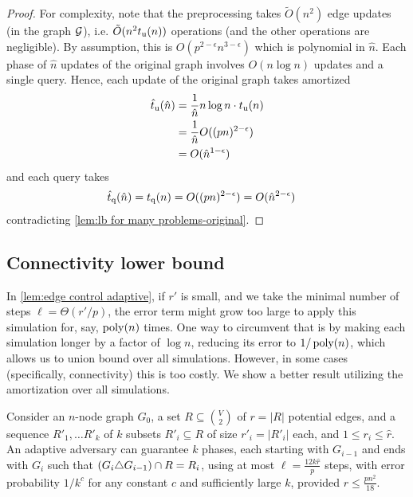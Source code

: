 \documentclass[letter,11pt]{article}
\newcommand{\tu}{t_{\textnormal{u}}}
\newcommand{\tq}{t_{\textnormal{q}}}
\begin{document}
\begin{proof}
    For complexity, 
    note that the preprocessing takes $\tilde O(n^2)$ edge updates (in the graph $\cal G$),
    i.e. $\tilde O(n^2\tu(n))$ operations
    (and the other operations are negligible).
    By assumption, this is 
    $O(p^{2-\epsilon}n^{3-\epsilon})$
    which is polynomial in $\hat n$.
    Each phase of $\hat n$ updates of the original graph involves $O(n\log n)$ updates and a single query.
    Hence, each update of the original graph takes amortized 
    \begin{equation*}
    \begin{split}
    \hat\tu(\hat n)
    	&=\frac{1}{\hat n}n\log n\cdot \tu(n)\\
    	&=\frac{1}{\hat n}	O((pn)^{2-\epsilon})\\
    	&=O(\hat n^{1-\epsilon})
    \end{split}
    \end{equation*}
    and each query takes 
	\begin{equation*}
	\begin{split}
			\hat\tq(\hat n)
			&=\tq(n)
			=O((pn)^{2-\epsilon})
			=O(\hat n^{2-\epsilon})
		\end{split}
	\end{equation*}    
    contradicting \cref{lem:lb for many problems-original}.
\end{proof}

\subsection{Connectivity lower bound}

In \cref{lem:edge control adaptive}, if $r'$ is small, and we take the minimal number of steps $\ell = \Theta(r'/p)$, the error term might grow too large to apply this simulation for, say, $\operatorname{poly}(n)$ times.
%
One way to circumvent that is by making each simulation longer by a factor of $\log n$, reducing its error to $1/\operatorname{poly}(n)$, which allows us to union bound over all simulations.
However, in some cases (specifically, connectivity) this is too costly. 
We show a better result utilizing the amortization over all simulations.


\begin{lemma}
	\label{lem:edge control adaptive with few changes}
    Consider an $n$-node graph $G_0$, a set $R\subseteq \binom{V}{2}$ of $r=|R|$ potential edges,
    and a sequence $R'_1,\ldots R'_k$ of $k$ subsets $R'_i\subseteq R$ of size $r'_i=|R'_i|$ each, and $1\leq r_i\leq \hat r$.
    An adaptive adversary can guarantee $k$ phases, each starting with $G_{i-1}$ and ends with $G_i$ such that $\left(G_i \symdif G_{i-1}\right) \cap R = R_i$, using at most $\ell=\frac{12k \hat{r}}{p}$ steps,
    with error probability $1/k^c$ for any constant $c$ and sufficiently large $k$, provided $r\leq\frac{pn^2}{18}$.
\end{lemma}
\end{document}
